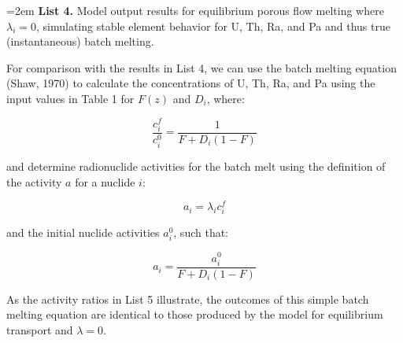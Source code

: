 \documentclass[11pt]{article}
\begin{document}
\hangindent=2em
    \textbf{List 4.} Model output results for equilibrium porous flow melting where $\lambda_i = 0$, simulating stable element behavior for U, Th, Ra, and Pa and thus true (instantaneous) batch melting.

\bigskip

For comparison with the results in List 4, we can use the batch melting equation (Shaw, 1970) to calculate the concentrations of U, Th, Ra, and Pa using the input values in Table 1 for $F(z)$ and $D_i$, where:

\begin{equation}
    \frac{c_i^f}{c_i^0} = \frac{1}{F + D_i(1-F)}\label{eq:61}
\end{equation}

and determine radionuclide activities for the batch melt using the definition of the activity $a$ for a nuclide $i$:

\begin{equation}
    a_i = \lambda_i c_i^f\label{eq:62}
\end{equation}

and the initial nuclide activities $a_i^0$, such that:

\begin{equation}
    a_i = \frac{a_i^0}{F + D_i (1 -  F)}\label{eq:63}
\end{equation}

As the activity ratios in List 5 illustrate, the outcomes of this simple batch melting equation are identical to those produced by the model for equilibrium transport and $\lambda=0$.
\end{document}

